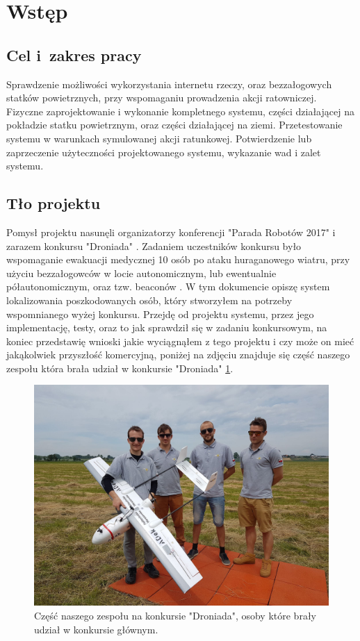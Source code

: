 \section{Wstęp}
\suppressfloats[t]  %
\subsection{Cel i~zakres pracy}

Sprawdzenie możliwości wykorzystania internetu rzeczy, oraz bezzałogowych statków powietrznych, przy wspomaganiu prowadzenia akcji ratowniczej. Fizyczne zaprojektowanie i wykonanie kompletnego systemu, części działającej na pokładzie statku powietrznym, oraz części działającej na ziemi. Przetestowanie systemu w warunkach symulowanej akcji ratunkowej. Potwierdzenie lub zaprzeczenie użyteczności projektowanego systemu, wykazanie wad i zalet systemu.

\subsection{Tło projektu}

Pomysł projektu nasunęli organizatorzy konferencji "Parada Robotów 2017" i zarazem konkursu "Droniada" \cite{droniada}. Zadaniem uczestników konkursu było wspomaganie ewakuacji medycznej 10 osób po ataku huraganowego wiatru, przy użyciu bezzałogowców w locie autonomicznym, lub ewentualnie półautonomicznym, oraz tzw. beaconów \cite{beacon}. W tym dokumencie opiszę system lokalizowania poszkodowanych osób, który stworzyłem na potrzeby wspomnianego wyżej konkursu. Przejdę od projektu systemu, przez jego implementację, testy, oraz to jak sprawdził się w zadaniu konkursowym, na koniec przedstawię wnioski jakie wyciągnąłem z tego projektu i czy może on mieć jakąkolwiek przyszłość komercyjną, poniżej na zdjęciu znajduje się część naszego zespołu która brała udział w konkursie "Droniada" \ref{fig:zespoldroniada}.

\begin{figure}[!th]
    \centering
    \includegraphics[width=15cm]{zalaczniki/obrazy/droniada.jpg}
    \caption{Część naszego zespołu na konkursie "Droniada", osoby które brały udział w konkursie głównym.}
    \label{fig:zespoldroniada}
\end{figure}

